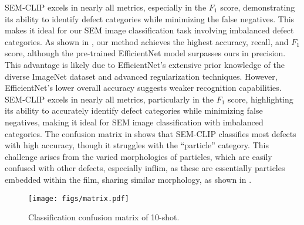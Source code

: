 SEM-CLIP excels in nearly all metrics, especially in the $F_{1}$ score, demonstrating its ability to identify defect categories while minimizing the false negatives. This makes it ideal for our SEM image classification task involving imbalanced defect categories.
As shown in , our method achieves the highest accuracy, recall, and $F_{1}$ score, although the pre-trained EfficientNet model surpasses ours in precision. This advantage is likely due to EfficientNet's extensive prior knowledge of the diverse ImageNet dataset and advanced regularization techniques. However, EfficientNet's lower overall accuracy suggests weaker recognition capabilities. SEM-CLIP excels in nearly all metrics, particularly in the $F_{1}$ score, highlighting its ability to accurately identify defect categories while minimizing false negatives, making it ideal for SEM image classification with imbalanced categories. The confusion matrix in  shows that SEM-CLIP classifies most defects with high accuracy, though it struggles with the ``particle'' category. This challenge arises from the varied morphologies of particles, which are easily confused with other defects, especially inflim, as these are essentially particles embedded within the film, sharing similar morphology, as shown in .

\begin{figure}[h]
    \centering
    \texttt{[image: figs/matrix.pdf]}
    \caption{Classification confusion matrix of 10-shot.}
    \label{10-shot matrix}
\end{figure}

